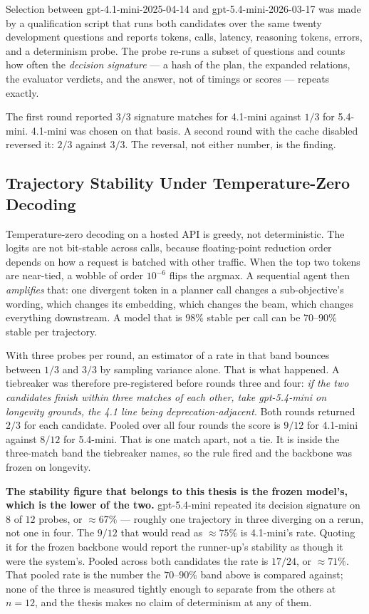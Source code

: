 Selection between \textsf{gpt-4.1-mini-2025-04-14} and
\textsf{gpt-5.4-mini-2026-03-17} was made by a qualification script that runs
both candidates over the same twenty development questions and reports tokens,
calls, latency, reasoning tokens, errors, and a determinism probe. The probe
re-runs a subset of questions and counts how often the \emph{decision signature}
--- a hash of the plan, the expanded relations, the evaluator verdicts, and the
answer, not of timings or scores --- repeats exactly.

The first round reported $3/3$ signature matches for 4.1-mini against $1/3$ for
5.4-mini. 4.1-mini was chosen on that basis. A second round with the cache
disabled reversed it: $2/3$ against $3/3$. The reversal, not either number, is
the finding.

\subsection{Trajectory Stability Under Temperature-Zero Decoding}

Temperature-zero decoding on a hosted API is greedy, not deterministic. The
logits are not bit-stable across calls, because floating-point reduction order
depends on how a request is batched with other traffic. When the top two
tokens are near-tied, a wobble of order $10^{-6}$ flips the argmax. A sequential
agent then \emph{amplifies} that: one divergent token in a planner call changes
a sub-objective's wording, which changes its embedding, which changes the beam,
which changes everything downstream. A model that is $98\%$ stable per call can
be $70$--$90\%$ stable per trajectory.

With three probes per round, an estimator of a rate in that band bounces between
$1/3$ and $3/3$ by sampling variance alone. That is what happened. A tiebreaker
was therefore pre-registered before rounds three and four: \emph{if the two
candidates finish within three matches of each other, take \textsf{gpt-5.4-mini}
on longevity grounds, the 4.1 line being deprecation-adjacent}. Both
rounds returned $2/3$ for each candidate. Pooled over all four rounds the score
is $9/12$ for 4.1-mini against $8/12$ for 5.4-mini. That is one match apart, not
a tie. It is inside the three-match band the tiebreaker names, so the rule fired
and the backbone was frozen on longevity.

\textbf{The stability figure that belongs to this thesis is the frozen model's,
which is the lower of the two.} \textsf{gpt-5.4-mini} repeated its decision
signature on $8$ of $12$ probes, or $\approx 67\%$ --- roughly one trajectory in
three diverging on a rerun, not one in four. The $9/12$ that would read as
$\approx 75\%$ is 4.1-mini's rate. Quoting it for the frozen backbone would
report the runner-up's stability as though it were the system's. Pooled across
both candidates the rate is $17/24$, or $\approx 71\%$. That pooled rate is the
number the $70$--$90\%$ band above is compared against; none of the three is
measured tightly enough to separate from the others at $n = 12$, and the thesis
makes no claim of determinism at any of them.

